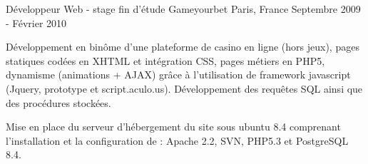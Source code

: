 \cventry
{Développeur Web - stage fin d'étude} %
{Gameyourbet} %
{Paris, France} %
{Septembre 2009 - Février 2010} %
{
\begin{cvitems} %
    \item
    {
        Développement en binôme d’une plateforme de casino en ligne (hors jeux),
        pages statiques codées en XHTML et intégration CSS, pages métiers en PHP5, dynamisme
        (animations + AJAX) grâce à l’utilisation de framework javascript (Jquery, prototype et script.aculo.us).
        Développement des requêtes SQL ainsi que des procédures stockées.
    }
    \item
    {
        Mise en place du serveur d'hébergement du site sous ubuntu 8.4 comprenant l'installation et la
        configuration de : Apache 2.2, SVN, PHP5.3 et PostgreSQL 8.4.
    }
\end{cvitems}
}